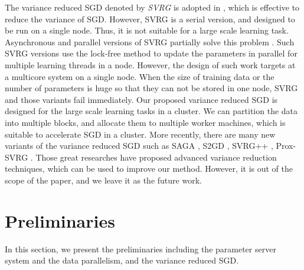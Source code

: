 \documentclass[preprint,review,11pt,a4paper]{elsarticle}
\begin{document}
The variance reduced SGD denoted by \emph{SVRG} is adopted in \cite{Johnson:9MAvkbgy}, which is  effective to reduce the variance of SGD. However, SVRG is a serial version, and designed to be run on a single node. Thus, it is not suitable for a large scale learning task. Asynchronous and parallel versions of SVRG partially solve this problem \cite{Zhao:SZfxEHHg, Reddi:2015vj, Mania:2015wa, lian2015asynchronous, Pan:2016wx}. Such SVRG versions use the lock-free method to update the parameters in parallel for multiple learning threads in a node. However, the design of such work targets at a multicore system on a single node. When the size of training data or the number of parameters  is huge so that they can not be stored in one node, SVRG and those variants fail immediately. Our proposed variance reduced SGD is designed for  the large scale learning tasks in a cluster. We can partition the data into multiple blocks, and allocate them to multiple worker machines, which is suitable to accelerate SGD in a cluster. More recently, there are many new variants of the variance reduced SGD such as SAGA \cite{Defazio:2014vu}, S2GD \cite{Richtarik:2013te}, SVRG++ \cite{Allen2015Improved}, Prox-SVRG \cite{Xiao:2014vw}. Those great researches have proposed advanced variance reduction techniques, which can be used to improve our method. However, it is out of the scope of the paper, and we leave it as the future work.


\section{Preliminaries}
\label{sect_preliminary}
In this section, we present the preliminaries including the parameter server system and the data parallelism, and the variance reduced SGD.
\end{document}

